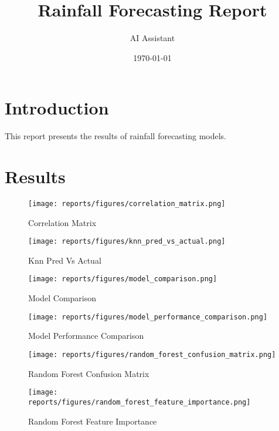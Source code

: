 \documentclass{article}
\begin{document}
\title{Rainfall Forecasting Report}
\author{AI Assistant}
\date{\today}
\maketitle

\section{Introduction}
This report presents the results of rainfall forecasting models.

\section{Results}

\begin{figure}[h!]
    \centering
    \texttt{[image: reports/figures/correlation\_matrix.png]}
    \caption{Correlation Matrix}
    \label{fig:correlation_matrix}
\end{figure}

\begin{figure}[h!]
    \centering
    \texttt{[image: reports/figures/knn\_pred\_vs\_actual.png]}
    \caption{Knn Pred Vs Actual}
    \label{fig:knn_pred_vs_actual}
\end{figure}

\begin{figure}[h!]
    \centering
    \texttt{[image: reports/figures/model\_comparison.png]}
    \caption{Model Comparison}
    \label{fig:model_comparison}
\end{figure}

\begin{figure}[h!]
    \centering
    \texttt{[image: reports/figures/model\_performance\_comparison.png]}
    \caption{Model Performance Comparison}
    \label{fig:model_performance_comparison}
\end{figure}

\begin{figure}[h!]
    \centering
    \texttt{[image: reports/figures/random\_forest\_confusion\_matrix.png]}
    \caption{Random Forest Confusion Matrix}
    \label{fig:random_forest_confusion_matrix}
\end{figure}

\begin{figure}[h!]
    \centering
    \texttt{[image: reports/figures/random\_forest\_feature\_importance.png]}
    \caption{Random Forest Feature Importance}
    \label{fig:random_forest_feature_importance}
\end{figure}
\end{document}
